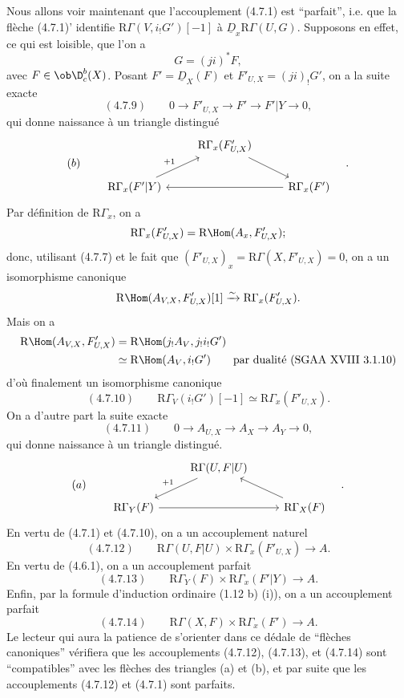 Nous allons voir maintenant que l'accouplement (4.7.1) est ``parfait'', i.e. que la flèche (4.7.1)' identifie $\mathrm{R}\Gamma(V,i_!G')[-1]$ à $\underline{D}_x\mathrm{R}\Gamma(U,G)$. Supposons en effet, ce qui est loisible, que l'on a
\[
G=(ji)^*F,
\]
avec $F\in\ob\D_c^b(X)$. Posant $F'=\underline{D}_X(F)$ et $F'_{U,X}=(ji)_!G'$, on a la suite exacte
\[
(4.7.9)\qquad 0\longrightarrow F'_{U,X}\longrightarrow F'\longrightarrow F'|Y\longrightarrow0,
\]
qui donne naissance à un triangle distingué
\[
(b)\qquad
\begin{tikzcd}
& \mathrm{R}\Gamma_x(F'_{U,X}) \arrow[dr] \\
\mathrm{R}\Gamma_x(F'|Y) \arrow[ur,"{+1}"] && \mathrm{R}\Gamma_x(F') \arrow[ll]
\end{tikzcd}\quad .
\]
Par définition de $\mathrm{R}\Gamma_x$, on a
\[
\mathrm{R}\Gamma_x(F'_{U,X})=\mathrm{R}\Hom(A_x,F'_{U,X});
\]
donc, utilisant (4.7.7) et le fait que $(F'_{U,X})_x=\mathrm{R}\Gamma(X,F'_{U,X})=0$, on a un isomorphisme canonique
\[
\mathrm{R}\Hom(A_{V,X},F'_{U,X})[1]\xrightarrow{\sim}\mathrm{R}\Gamma_x(F'_{U,X}).
\]
Mais on a
\[
\begin{aligned}
\mathrm{R}\Hom(A_{V,X},F'_{U,X})&=\mathrm{R}\Hom(j_!A_V,j_!i_!G')\\
&\simeq\mathrm{R}\Hom(A_V,i_!G')\qquad\text{par dualité (SGAA~XVIII~3.1.10)}
\end{aligned}
\]
d'où finalement un
isomorphisme canonique
\[
(4.7.10)\qquad \mathrm{R}\Gamma_V(i_!G')[-1]\simeq\mathrm{R}\Gamma_x(F'_{U,X}).
\]
On a d'autre part la suite exacte
\[
(4.7.11)\qquad 0\longrightarrow A_{U,X}\longrightarrow A_X\longrightarrow A_Y\longrightarrow0,
\]
qui donne naissance à un triangle distingué.
\[
(a)\qquad
\begin{tikzcd}
& \mathrm{R}\Gamma(U,F|U) \arrow[dl,"{+1}"'] \\
\mathrm{R}\Gamma_Y(F) \arrow[rr] && \mathrm{R}\Gamma_X(F) \arrow[ul]
\end{tikzcd}\quad .
\]
En vertu de (4.7.1) et (4.7.10), on a un accouplement naturel
\[
(4.7.12)\qquad \mathrm{R}\Gamma(U,F|U)\times\mathrm{R}\Gamma_x(F'_{U,X})\longrightarrow A.
\]
En vertu de (4.6.1), on a un accouplement parfait
\[
(4.7.13)\qquad \mathrm{R}\Gamma_Y(F)\times\mathrm{R}\Gamma_x(F'|Y)\longrightarrow A.
\]
Enfin, par la formule d'induction ordinaire (1.12 b) (i)), on a un accouplement parfait
\[
(4.7.14)\qquad \mathrm{R}\Gamma(X,F)\times\mathrm{R}\Gamma_x(F')\longrightarrow A.
\]
Le lecteur qui aura la patience de s'orienter dans ce dédale de ``flèches canoniques'' vérifiera que les accouplements (4.7.12), (4.7.13), et (4.7.14) sont ``compatibles'' avec les flèches des triangles (a) et (b), et par suite que les accouplements (4.7.12) et (4.7.1) sont parfaits.

